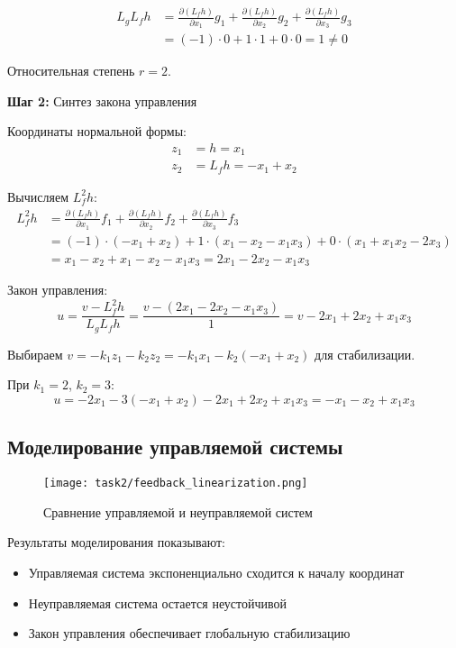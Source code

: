 \begin{align}
L_g L_f h &= \frac{\partial (L_f h)}{\partial x_1} g_1 + \frac{\partial (L_f h)}{\partial x_2} g_2 + \frac{\partial (L_f h)}{\partial x_3} g_3 \\
&= (-1) \cdot 0 + 1 \cdot 1 + 0 \cdot 0 = 1 \neq 0
\end{align}

Относительная степень $r = 2$.

\textbf{Шаг 2:} Синтез закона управления

Координаты нормальной формы:
\begin{align}
z_1 &= h = x_1 \\
z_2 &= L_f h = -x_1 + x_2
\end{align}

Вычисляем $L_f^2 h$:
\begin{align}
L_f^2 h &= \frac{\partial (L_f h)}{\partial x_1} f_1 + \frac{\partial (L_f h)}{\partial x_2} f_2 + \frac{\partial (L_f h)}{\partial x_3} f_3 \\
&= (-1) \cdot (-x_1 + x_2) + 1 \cdot (x_1 - x_2 - x_1 x_3) + 0 \cdot (x_1 + x_1 x_2 - 2x_3) \\
&= x_1 - x_2 + x_1 - x_2 - x_1 x_3 = 2x_1 - 2x_2 - x_1 x_3
\end{align}

Закон управления:
\begin{equation}
u = \frac{v - L_f^2 h}{L_g L_f h} = \frac{v - (2x_1 - 2x_2 - x_1 x_3)}{1} = v - 2x_1 + 2x_2 + x_1 x_3
\end{equation}

Выбираем $v = -k_1 z_1 - k_2 z_2 = -k_1 x_1 - k_2 (-x_1 + x_2)$ для стабилизации.

При $k_1 = 2$, $k_2 = 3$:
\begin{equation}
u = -2x_1 - 3(-x_1 + x_2) - 2x_1 + 2x_2 + x_1 x_3 = -x_1 - x_2 + x_1 x_3
\end{equation}

\subsection{Моделирование управляемой системы}

\begin{figure}[H]
\centering
\texttt{[image: task2/feedback\_linearization.png]}
\caption{Сравнение управляемой и неуправляемой систем}
\label{fig:feedback_linearization}
\end{figure}

Результаты моделирования показывают:
\begin{itemize}
\item Управляемая система экспоненциально сходится к началу координат
\item Неуправляемая система остается неустойчивой
\item Закон управления обеспечивает глобальную стабилизацию
\end{itemize}

